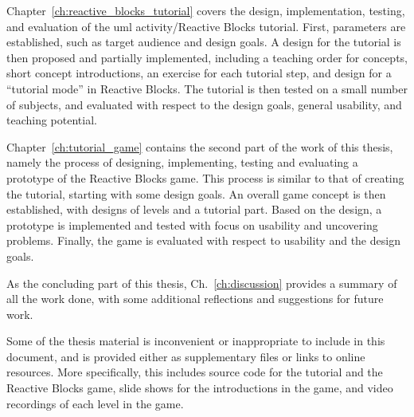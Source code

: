 \noindent
Chapter~\ref{ch:reactive_blocks_tutorial} covers the design, implementation, testing, and evaluation of the \gls{uml} activity/Reactive Blocks tutorial. First, parameters are established, such as target audience and design goals. A design for the tutorial is then proposed and partially implemented, including a teaching order for concepts, short concept introductions, an exercise for each tutorial step, and design for a ``tutorial mode'' in Reactive Blocks. The tutorial is then tested on a small number of subjects, and evaluated with respect to the design goals, general usability, and teaching potential.

\noindent
Chapter~\ref{ch:tutorial_game} contains the second part of the work of this thesis, namely the process of designing, implementing, testing and evaluating a prototype of the Reactive Blocks game. This process is similar to that of creating the tutorial, starting with some design goals. An overall game concept is then established, with designs of levels and a tutorial part. Based on the design, a prototype is implemented and tested with focus on usability and uncovering problems. Finally, the game is evaluated with respect to usability and the design goals.

\noindent
As the concluding part of this thesis, Ch.~\ref{ch:discussion} provides a summary of all the work done, with some additional reflections and suggestions for future work.

\noindent
Some of the thesis material is inconvenient or inappropriate to include in this document, and is provided either as supplementary files or links to online resources. More specifically, this includes source code for the tutorial and the Reactive Blocks game, slide shows for the introductions in the game, and video recordings of each level in the game.